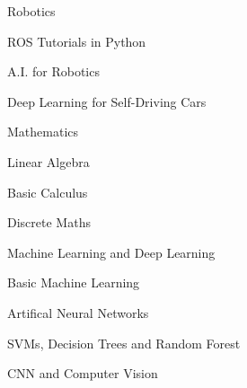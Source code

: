 \begin{courseentries}
{\begin{cvitems}
    \end{cvitems}
      }
  \courseentry
    {Robotics} %
    {    
    \begin{cvitems} %
        \item {ROS Tutorials in Python}
    \end{cvitems}
      }
    {    
    \begin{cvitems} %
        \item {A.I. for Robotics}
    \end{cvitems}
      }
    {    
    \begin{cvitems} %
        \item {Deep Learning for Self-Driving Cars}
    \end{cvitems}
      }
  \courseentry
    {Mathematics} %
    {    
    \begin{cvitems} %
        \item {Linear Algebra}
    \end{cvitems}
      }
    {    
    \begin{cvitems} %
        \item {Basic Calculus}
    \end{cvitems}
      }
    {    
    \begin{cvitems} %
        \item {Discrete Maths}
    \end{cvitems}
      }
  \courseentry
    {Machine Learning and Deep Learning} %
    {    
    \begin{cvitems} %
        \item {Basic Machine Learning}
        \item {Artifical Neural Networks}
    \end{cvitems}
      }
    {    
    \begin{cvitems} %
        \item {SVMs, Decision Trees and Random Forest}
    \end{cvitems}
      }
    {    
    \begin{cvitems} %
        \item {CNN and Computer Vision}
    \end{cvitems}
      }
\end{courseentries}
